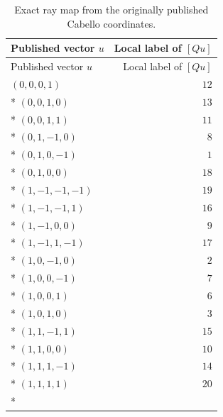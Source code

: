\documentclass[aps,pra,reprint,superscriptaddress,longbibliography,nofootinbib,floatfix,10pt]{revtex4-2}
\theoremstyle{definition}
\begin{document}
\begin{longtable}{lr}
\caption{Exact ray map from the originally published Cabello coordinates.}\label{tab:cabello-published-map}\\
\toprule
Published vector $u$ & Local label of $[Qu]$\\\midrule
\endfirsthead
\toprule
Published vector $u$ & Local label of $[Qu]$\\\midrule
\endhead
\bottomrule\endfoot
$(0,0,0,1)$ & $12$\\*
$(0,0,1,0)$ & $13$\\*
$(0,0,1,1)$ & $11$\\*
$(0,1,-1,0)$ & $8$\\*
$(0,1,0,-1)$ & $1$\\*
$(0,1,0,0)$ & $18$\\*
$(1,-1,-1,-1)$ & $19$\\*
$(1,-1,-1,1)$ & $16$\\*
$(1,-1,0,0)$ & $9$\\*
$(1,-1,1,-1)$ & $17$\\*
$(1,0,-1,0)$ & $2$\\*
$(1,0,0,-1)$ & $7$\\*
$(1,0,0,1)$ & $6$\\*
$(1,0,1,0)$ & $3$\\*
$(1,1,-1,1)$ & $15$\\*
$(1,1,0,0)$ & $10$\\*
$(1,1,1,-1)$ & $14$\\*
$(1,1,1,1)$ & $20$\\*
\end{longtable}
\endgroup
\end{document}
